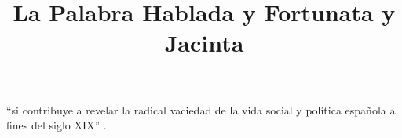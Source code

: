 \documentclass[12pt]{article}
\title{La Palabra Hablada y Fortunata y Jacinta}
\makeatletter
\newcommand\iraggedright{%
	\let\\\@centercr\@rightskip\@flushglue \rightskip\@rightskip
	\leftskip\z@skip}
\makeatother
\begin{document}
	\makeheader
	\iraggedright
\enquote{si contribuye a revelar la radical vaciedad de la vida social y política española a fines del siglo XIX} \cite[543]{Gilman...}.




\makeworkscited
\listoftodos
\end{document}
